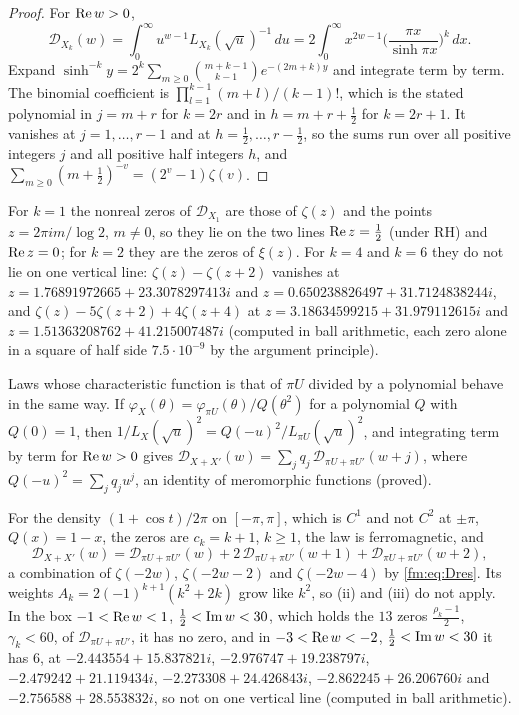 \begin{proof}
For $\operatorname{Re} w>0$,
\[
\mathcal D_{X_k}(w)=\int_0^\infty u^{w-1}L_{X_k}(\sqrt u)^{-1}\,du=2\int_0^\infty x^{2w-1}\Big(\frac{\pi x}{\sinh\pi x}\Big)^k\,dx.
\]
Expand $\sinh^{-k}y=2^k\sum_{m\ge0}\binom{m+k-1}{k-1}e^{-(2m+k)y}$ and integrate term by term. The binomial coefficient is $\prod_{l=1}^{k-1}(m+l)/(k-1)!$, which is the stated polynomial in $j=m+r$ for $k=2r$ and in $h=m+r+\frac12$ for $k=2r+1$. It vanishes at $j=1,\dots,r-1$ and at $h=\frac12,\dots,r-\frac12$, so the sums run over all positive integers $j$ and all positive half integers $h$, and $\sum_{m\ge0}(m+\frac12)^{-v}=(2^v-1)\zeta(v)$.
\end{proof}

\begin{resultpar}\label{fm:res:kzeros}For $k=1$ the nonreal zeros of $\mathcal D_{X_1}$ are those of $\zeta(z)$ and the points $z=2\pi im/\log2$, $m\ne0$, so they lie on the two lines $\operatorname{Re} z=\frac12$ (under RH) and $\operatorname{Re} z=0$; for $k=2$ they are the zeros of $\xi(z)$. For $k=4$ and $k=6$ they do not lie on one vertical line: $\zeta(z)-\zeta(z+2)$ vanishes at $z=1.76891972665+23.3078297413i$ and $z=0.650238826497+31.7124838244i$, and $\zeta(z)-5\zeta(z+2)+4\zeta(z+4)$ at $z=3.18634599215+31.979112615i$ and $z=1.51363208762+41.215007487i$ (computed in ball arithmetic, each zero alone in a square of half side $7.5\cdot10^{-9}$ by the argument principle).\end{resultpar}

Laws whose characteristic function is that of $\pi U$ divided by a polynomial behave in the same way. If $\varphi_X(\theta)=\varphi_{\pi U}(\theta)/Q(\theta^2)$ for a polynomial $Q$ with $Q(0)=1$, then $1/L_X(\sqrt u)^2=Q(-u)^2/L_{\pi U}(\sqrt u)^2$, and integrating term by term for $\operatorname{Re} w>0$ gives $\mathcal D_{X+X'}(w)=\sum_jq_j\,\mathcal D_{\pi U+\pi U'}(w+j)$, where $Q(-u)^2=\sum_jq_ju^j$, an identity of meromorphic functions (proved).

\begin{resultpar}\label{fm:res:onecos}For the density $(1+\cos t)/2\pi$ on $[-\pi,\pi]$, which is $C^1$ and not $C^2$ at $\pm\pi$, $Q(x)=1-x$, the zeros are $c_k=k+1$, $k\ge1$, the law is ferromagnetic, and
\[
\mathcal D_{X+X'}(w)=\mathcal D_{\pi U+\pi U'}(w)+2\,\mathcal D_{\pi U+\pi U'}(w+1)+\mathcal D_{\pi U+\pi U'}(w+2),
\]
a combination of $\zeta(-2w)$, $\zeta(-2w-2)$ and $\zeta(-2w-4)$ by \eqref{fm:eq:Dres}. Its weights $A_k=2(-1)^{k+1}(k^2+2k)$ grow like $k^2$, so (ii) and (iii) do not apply. In the box $-1<\operatorname{Re} w<1$, $\frac12<\operatorname{Im} w<30$, which holds the $13$ zeros $\frac{\rho_k-1}2$, $\gamma_k<60$, of $\mathcal D_{\pi U+\pi U'}$, it has no zero, and in $-3<\operatorname{Re} w<-2$, $\frac12<\operatorname{Im} w<30$ it has $6$, at $-2.443554+15.837821i$, $-2.976747+19.238797i$, $-2.479242+21.119434i$, $-2.273308+24.426843i$, $-2.862245+26.206760i$ and $-2.756588+28.553832i$, so not on one vertical line (computed in ball arithmetic).\end{resultpar}

